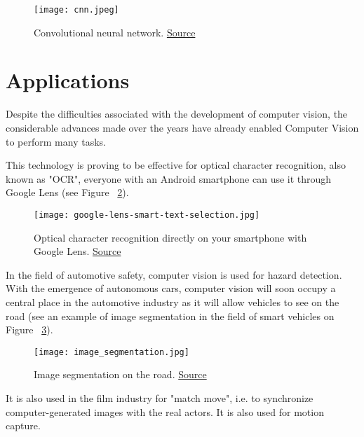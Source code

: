 \begin{figure}[H]
  \centering
  \texttt{[image: cnn.jpeg]}
  \caption{Convolutional neural network. \href{https://towardsdatascience.com/a-comprehensive-guide-to-convolutional-neural-networks-the-eli5-way-3bd2b1164a53}{Source}}
  \label{fig:cnn}
\end{figure}

\pagebreak\section{Applications}

Despite the difficulties associated with the development of computer vision, the considerable advances made over the years have already enabled Computer Vision to perform many tasks.

This technology is proving to be effective for optical character recognition, also known as "OCR", everyone with an Android smartphone can use it through Google Lens (see Figure ~\ref{fig:glens}).
\begin{figure}[H]
  \centering
  \texttt{[image: google-lens-smart-text-selection.jpg]}
  \caption{Optical character recognition directly on your smartphone with Google Lens. \href{https://www.androidauthority.com/google-lens-camera-app-863117/}{Source}}
  \label{fig:glens}
\end{figure}
\pagebreak
In the field of automotive safety, computer vision is used for hazard detection. With the emergence of autonomous cars, computer vision will soon occupy a central place in the automotive industry as it will allow vehicles to see on the road (see an example of image segmentation in the field of smart vehicles on Figure ~\ref{fig:carseg}).

\begin{figure}[H]
  \centering
  \texttt{[image: image\_segmentation.jpg]}
  \caption{Image segmentation on the road. \href{https://towardsdatascience.com/learning-computer-vision-41398ad9941f}{Source}}
  \label{fig:carseg}
\end{figure}%

\pagebreak
It is also used in the film industry for "match move", i.e. to synchronize computer-generated images with the real actors. It is also used for motion capture.

